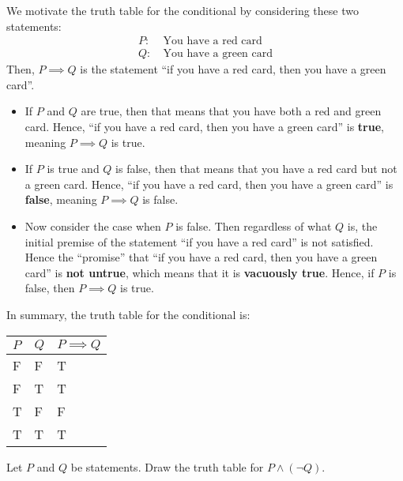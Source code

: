 We motivate the truth table for the conditional by considering these two statements:
\begin{align*}
    P: &\ \text{You have a red card}\\
    Q: &\ \text{You have a green card}
\end{align*}
Then, $P \implies Q$ is the statement ``if you have a red card, then you have a green card''.
\begin{itemize}
    \item If $P$ and $Q$ are true, then that means that you have both a red and green card. Hence, ``if you have a red card, then you have a green card'' is \textbf{true}, meaning $P \implies Q$ is true.
    \item If $P$ is true and $Q$ is false, then that means that you have a red card but not a green card. Hence, ``if you have a red card, then you have a green card'' is \textbf{false}, meaning $P \implies Q$ is false.
    \item Now consider the case when $P$ is false. Then regardless of what $Q$ is, the initial premise of the statement ``if you have a red card'' is not satisfied. Hence the ``promise'' that ``if you have a red card, then you have a green card'' is \textbf{not untrue}, which means that it is \textbf{vacuously true}. Hence, if $P$ is false, then $P \implies Q$ is true.
\end{itemize}

In summary, the truth table for the conditional is:
\begin{table}[h]
    \centering
    \begin{tabular}{|l|l||l|}
        \hline
        $P$ & $Q$ & $P\implies Q$ \\ \hline
        F   & F   & T             \\ \hline
        F   & T   & T             \\ \hline
        T   & F   & F             \\ \hline
        T   & T   & T             \\ \hline
    \end{tabular}
\end{table}

\begin{exercise}
    Let $P$ and $Q$ be statements. Draw the truth table for $P \land (\lnot Q)$.
\end{exercise}

